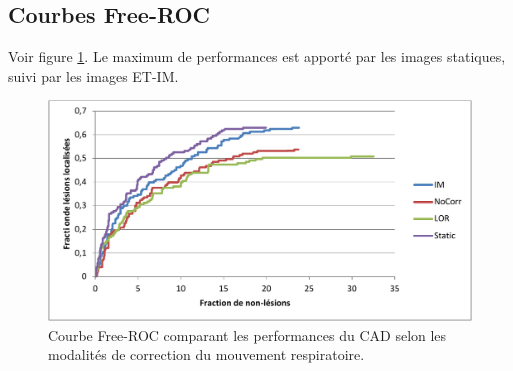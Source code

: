 \subsection{Courbes Free-ROC}

Voir figure \ref{lab:froc_comp_static}.
Le maximum de performances est apporté par les images statiques, suivi par les images ET-IM.

\begin{figure}[h!]
 \begin{center}
   \includegraphics[width=15cm]{images/JAFROC_mod}
 \end{center}
 \caption{ \label{lab:froc_comp_static} Courbe Free-ROC comparant les performances du CAD selon les modalités de correction du mouvement respiratoire.}
\end{figure}


